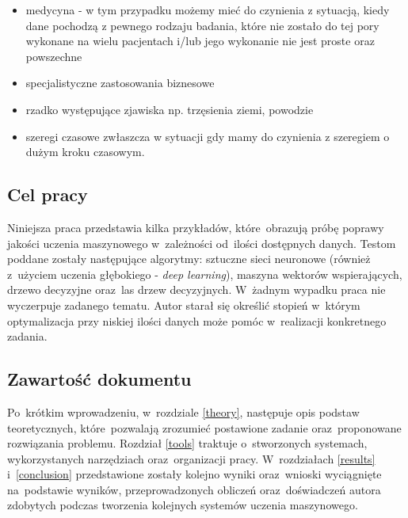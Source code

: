 \begin{itemize}
\item medycyna - w tym przypadku możemy mieć do czynienia z sytuacją, kiedy dane pochodzą z pewnego rodzaju badania, które nie zostało do tej pory wykonane na wielu pacjentach i/lub jego wykonanie nie jest proste oraz powszechne
\item specjalistyczne zastosowania biznesowe
\item rzadko występujące zjawiska np. trzęsienia ziemi, powodzie
\item szeregi czasowe  zwłaszcza w sytuacji gdy mamy do czynienia z szeregiem o dużym kroku czasowym.
\end{itemize}

\subsection{Cel pracy}
Niniejsza praca przedstawia kilka przykładów, które~obrazują próbę poprawy jakości uczenia maszynowego w~zależności od~ilości dostępnych danych. Testom poddane  zostały następujące algorytmy: sztuczne sieci neuronowe (również z~użyciem uczenia głębokiego - \textit{deep learning}), maszyna wektorów wspierających, drzewo decyzyjne oraz~las drzew decyzyjnych. W~żadnym wypadku praca nie wyczerpuje zadanego tematu. Autor starał się określić stopień w~którym optymalizacja przy niskiej ilości danych może pomóc w~realizacji konkretnego zadania.

\subsection{Zawartość dokumentu}
Po~krótkim wprowadzeniu, w~rozdziale \ref{theory}, następuje opis podstaw teoretycznych, które~pozwalają zrozumieć postawione zadanie oraz~proponowane rozwiązania problemu. Rozdział \ref{tools} traktuje o~stworzonych systemach, wykorzystanych narzędziach oraz~organizacji pracy. W~rozdziałach \ref{results} i~\ref{conclusion} przedstawione zostały kolejno wyniki oraz~wnioski wyciągnięte na~podstawie wyników, przeprowadzonych obliczeń oraz~doświadczeń autora zdobytych podczas tworzenia kolejnych systemów uczenia maszynowego.




